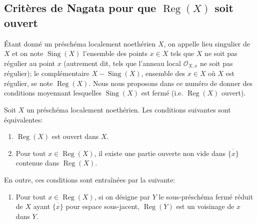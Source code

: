 \subsection{Critères de Nagata pour que $\operatorname{Reg}(X)$ soit ouvert}
\label{IV.2.s6.12-fr}

\begin{env}[6.12.1]
\label{IV.2.s6.12.1-fr}
Étant donné un préschéma localement noethérien $X$, on appelle lieu
singulier de $X$ et on note $\operatorname{Sing}(X)$ l'ensemble des points
$x\in X$ tels que $X$ ne soit pas régulier au point $x$ (autrement dit,
tels que l'anneau local $\mathcal O_{X,x}$ ne soit pas régulier); le
complémentaire $X-\operatorname{Sing}(X)$, ensemble des $x\in X$ où $X$ est
régulier, se note $\operatorname{Reg}(X)$. Nous nous proposons dans ce
numéro de donner des conditions moyennant lesquelles
$\operatorname{Sing}(X)$ est fermé (i.e. $\operatorname{Reg}(X)$ ouvert).
\end{env}

\begin{proposition}[6.12.2]
\label{IV.2.s6.12.2-fr}
Soit $X$ un préschéma localement noethérien. Les conditions suivantes sont
équivalentes:
\begin{enumerate}
\item[a)] $\operatorname{Reg}(X)$ est ouvert dans $X$.
\item[b)] Pour tout $x\in\operatorname{Reg}(X)$, il existe une partie
ouverte non vide dans $\overline{\{x\}}$ contenue dans
$\operatorname{Reg}(X)$.
\end{enumerate}
En outre, ces conditions sont entraînées par la suivante:
\begin{enumerate}
\item[c)] Pour tout $x\in\operatorname{Reg}(X)$, si on désigne par $Y$ le
sous-préschéma fermé réduit de $X$ ayant $\overline{\{x\}}$ pour espace
sous-jacent, $\operatorname{Reg}(Y)$ est un voisinage de $x$ dans $Y$.
\end{enumerate}
\end{proposition}

